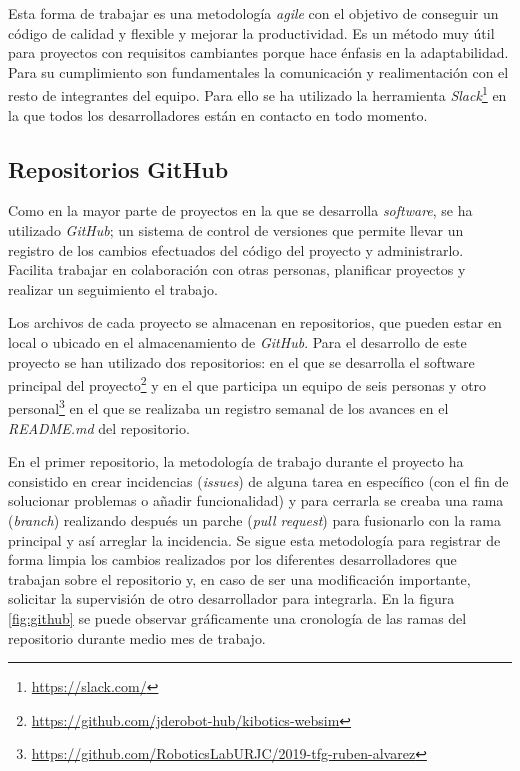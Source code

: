 Esta forma de trabajar es una metodología \textit{agile} con el objetivo de conseguir un código de calidad y flexible y mejorar la productividad. Es un método muy útil para proyectos con requisitos cambiantes porque hace énfasis en la adaptabilidad. 
Para su cumplimiento son fundamentales la comunicación y realimentación con el resto de integrantes del equipo. Para ello se ha utilizado la herramienta \textit{Slack}\footnote{\url{https://slack.com/}} en la que todos los desarrolladores están en contacto en todo momento.


\subsection{Repositorios GitHub}
\label{subsec:github}
Como en la mayor parte de proyectos en la que se desarrolla \textit{software}, se ha utilizado \textit{GitHub}; un sistema de control de versiones que permite llevar un registro de los cambios efectuados del código del proyecto y administrarlo. Facilita trabajar en colaboración con otras personas, planificar proyectos y realizar un seguimiento el trabajo. \newline

Los archivos de cada proyecto se almacenan en repositorios, que pueden estar en local o ubicado en el almacenamiento de \textit{GitHub}. Para el desarrollo de este proyecto se han utilizado dos repositorios:  en el que se desarrolla el software principal del proyecto\footnote{\url{https://github.com/jderobot-hub/kibotics-websim}} y en el que participa un equipo de seis personas y otro personal\footnote{\url{https://github.com/RoboticsLabURJC/2019-tfg-ruben-alvarez}}   en el que se realizaba un registro semanal de los avances en el \textit{README.md} del repositorio.
\newline

En el primer repositorio, la metodología de trabajo durante el proyecto ha consistido en crear incidencias (\textit{issues}) de alguna tarea en específico (con el fin de solucionar problemas o añadir funcionalidad) y para cerrarla se creaba una rama (\textit{branch}) realizando después un parche (\textit{pull request}) para fusionarlo con la rama principal y así arreglar la incidencia. Se sigue esta metodología para registrar de forma limpia los cambios realizados por los diferentes desarrolladores que trabajan sobre el repositorio y, en caso de ser una modificación importante, solicitar la supervisión de otro desarrollador para integrarla. En la figura \ref{fig:github} se puede observar gráficamente una cronología de las ramas del repositorio durante medio mes de trabajo.

